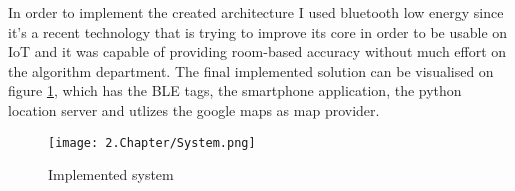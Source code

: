 In order to implement the created architecture I used bluetooth low energy since it's a recent technology that is trying to improve its core in order to be usable on \ac{IoT} and it was capable of providing room-based accuracy without much effort on the algorithm department. The final implemented solution can be visualised on figure \ref{fig:solution}, which has the \ac{BLE} tags, the smartphone application, the python location server and utlizes the google maps as map provider.

 \begin{figure}[H]
	\centering
		\texttt{[image: 2.Chapter/System.png]}
	\caption[Implemented system]{Implemented system}
	\label{fig:solution}
\end{figure}